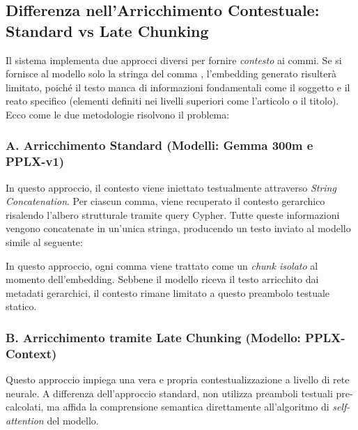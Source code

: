 \subsection{Differenza nell'Arricchimento Contestuale: Standard vs Late Chunking}
\label{subsec:arricchimento_contestuale}
 
Il sistema implementa due approcci diversi per fornire \textit{contesto} ai commi. Se si fornisce al modello solo la stringa del comma , l'embedding generato risulterà limitato, poiché il testo manca di informazioni fondamentali come il soggetto e il reato specifico (elementi definiti nei livelli superiori come l'articolo o il titolo).
Ecco come le due metodologie risolvono il problema:
 
\subsubsection{A. Arricchimento Standard (Modelli: Gemma 300m e PPLX-v1)}
 
In questo approccio, il contesto viene iniettato testualmente attraverso \textit{String Concatenation}.
Per ciascun comma, viene recuperato il contesto gerarchico risalendo l'albero strutturale tramite query Cypher. Tutte queste informazioni vengono concatenate in un'unica stringa, producendo un testo inviato al modello simile al seguente:

\begin{center}
    \texttt{}
\end{center}

In questo approccio, ogni comma viene trattato come un \textit{chunk isolato} al momento dell'embedding. Sebbene il modello riceva il testo arricchito dai metadati gerarchici, il contesto rimane limitato a questo preambolo testuale statico.
 
\subsubsection{B. Arricchimento tramite Late Chunking (Modello: PPLX-Context)}
 
Questo approccio impiega una vera e propria contestualizzazione a livello di rete neurale. A differenza dell'approccio standard, non utilizza preamboli testuali pre-calcolati, ma affida la comprensione semantica direttamente all'algoritmo di \textit{self-attention} del modello.


